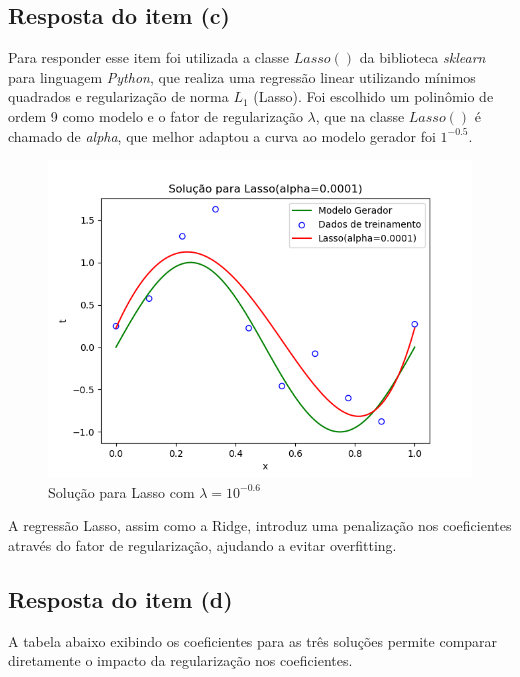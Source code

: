 \subsection{Resposta do item (c)}
Para responder esse item foi utilizada a classe $Lasso()$ da biblioteca \textit{sklearn} para linguagem \textit{Python}, que realiza uma regressão linear utilizando mínimos quadrados e regularização de norma $L_1$ (Lasso). Foi escolhido um polinômio de ordem 9 como modelo e o fator de regularização $\lambda$, que na classe $Lasso()$ é chamado de \textit{alpha}, que melhor adaptou a curva ao modelo gerador foi $1^{-0.5}$.
\begin{figure}[H]
    \centering
    \caption{Solução para Lasso com $\lambda = 10^{-0.6}$}
    \includegraphics[width=12cm]{E1_c.png}
\end{figure}
A regressão Lasso, assim como a Ridge, introduz uma penalização nos coeficientes através do fator de regularização, ajudando a evitar overfitting.

\subsection{Resposta do item (d)}

A tabela abaixo exibindo os coeficientes para as três soluções permite comparar diretamente o impacto da regularização nos coeficientes.

